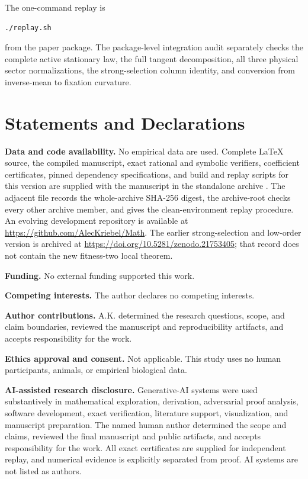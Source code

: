 The one-command replay is
\begin{verbatim}
./replay.sh
\end{verbatim}
from the paper package.  The package-level integration audit separately
checks the complete active stationary law, the full tangent decomposition,
all three physical sector normalizations, the strong-selection column identity, and
conversion from inverse-mean to fixation curvature.

\section*{Statements and Declarations}

\noindent\textbf{Data and code availability.}
No empirical data are used.  Complete LaTeX source, the compiled manuscript,
exact rational and symbolic verifiers, coefficient certificates, pinned
dependency specifications, and build and replay scripts for this version are
supplied with the manuscript in the standalone archive
.  The
adjacent file
records the whole-archive SHA-256 digest, the archive-root
 checks every other archive member, and
 gives the clean-environment replay
procedure.  An evolving development repository is available at
\url{https://github.com/AlecKriebel/Math}.  The earlier strong-selection and
low-order version is archived at
\url{https://doi.org/10.5281/zenodo.21753405}; that record does not contain
the new fitness-two local theorem.

\medskip
\noindent\textbf{Funding.}
No external funding supported this work.

\medskip
\noindent\textbf{Competing interests.}
The author declares no competing interests.

\medskip
\noindent\textbf{Author contributions.}
A.K. determined the research questions, scope, and claim boundaries, reviewed
the manuscript and reproducibility artifacts, and accepts responsibility for
the work.

\medskip
\noindent\textbf{Ethics approval and consent.}
Not applicable.  This study uses no human participants, animals, or empirical
biological data.

\medskip
\noindent\textbf{AI-assisted research disclosure.}
Generative-AI systems were used substantively in mathematical exploration,
derivation, adversarial proof analysis, software development, exact
verification, literature support, visualization, and manuscript preparation.
The named human author determined the scope and claims, reviewed the final
manuscript and public artifacts, and accepts responsibility for the work.  All
exact certificates are supplied for independent replay, and numerical
evidence is explicitly separated from proof.  AI systems are not listed as
authors.
